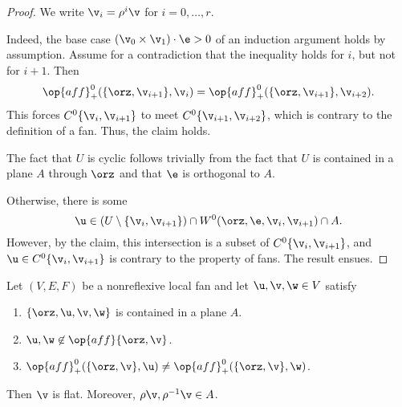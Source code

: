\begin{proof} 
We write $\v_i = \rho^i \v$ for $i=0,\ldots,r$.

Indeed, the base case $(\v_0\times \v_1)\cdot \e > 0$ of an induction
argument holds by assumption.  Assume for a contradiction that the
inequality holds for $i$, but not for $i+1$.  Then
\[ 
  \op{aff}^0_+(\{\orz,\v_{i+1}\},\v_i) 
= \op{aff}^0_+(\{\orz,\v_{i+1}\},\v_{i+2}).
\]  
This forces $C^0\{\v_i,\v_{i+1}\}$ to meet $C^0\{\v_{i+1},\v_{i+2}\}$,
which is contrary to the definition of a fan.  Thus, the claim holds.

The fact that $U$ is cyclic follows trivially from the fact that $U$
is contained in a plane $A$ through $\orz$ and that $\e$ is orthogonal
to $A$.

Otherwise, there is some 
\[ 
  \u \in (U\setminus \{\v_i,\v_{i+1}\}) 
\cap W^0(\orz,\e,\v_i,\v_{i+1}) \cap A.
\] 
However, by the claim, this intersection is a subset of $C^0\{\v_i,\v_{i+1}\}$, and
$\u\in C^0\{\v_i,\v_{i+1}\}$ is contrary to the property
 of fans.  The result ensues.
\end{proof}

\begin{lemma}[] \label{lemma:A}  
Let $(V,E,F)$ be a nonreflexive local fan and let
  $\u,\v,\w\in V$ satisfy
\begin{enumerate}\wasitemize 
\item $\{\orz,\u,\v,\w\}$ is contained in a plane $A$. \vspace{3pt}
\item $\u,\w\not\in\op{aff}\{\orz,\v\}$. \vspace{3pt}
\item $\op{aff}^0_+(\{\orz,\v\},\u) \ne \op{aff}^0_+(\{\orz,\v\},\w)$.
\end{enumerate}\wasitemize 
Then $\v$ is flat.  Moreover, $\rho \v,\rho^{-1} \v\in A$.
\end{lemma}

